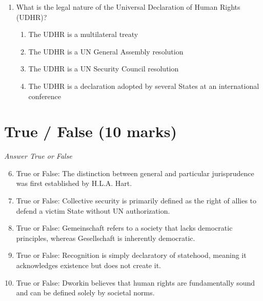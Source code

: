 \documentclass[12pt]{article}
\begin{document}
\begin{enumerate}[label=\arabic*.]
\begin{enumerate}[label=(\alph*)]
    \item The letter is an offer to sell
    \item A valid offer cannot be made by letter.
    \item The letter contains a valid offer which will terminate within a reasonable time.
    \item The letter lacks one of the essential elements of an offer.
\end{enumerate}
\item What is the legal nature of the Universal Declaration of Human Rights (UDHR)?
\begin{enumerate}[label=(\alph*)]
    \item The UDHR is a multilateral treaty
    \item The UDHR is a UN General Assembly resolution
    \item The UDHR is a UN Security Council resolution
    \item The UDHR is a declaration adopted by several States at an international conference
\end{enumerate}
\end{enumerate}

\section*{True / False (10 marks)}
\textit{Answer True or False}
\begin{enumerate}[label=\arabic*.]
\setcounter{enumi}{5}
\item True or False: The distinction between general and particular jurisprudence was first established by H.L.A. Hart.
\item True or False: Collective security is primarily defined as the right of allies to defend a victim State without UN authorization.
\item True or False: Gemeinschaft refers to a society that lacks democratic principles, whereas Gesellschaft is inherently democratic.
\item True or False: Recognition is simply declaratory of statehood, meaning it acknowledges existence but does not create it.
\item True or False: Dworkin believes that human rights are fundamentally sound and can be defined solely by societal norms.
\end{enumerate}
\end{document}
